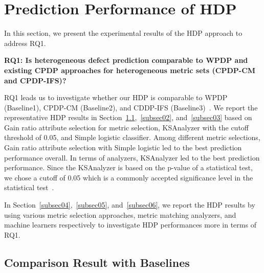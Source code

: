 \section{Prediction Performance of HDP}
\label{sec:Result}
In this section, we present the experimental results of the HDP approach to address RQ1.

{\bf RQ1: Is heterogeneous defect prediction comparable to WPDP and existing CPDP approaches for heterogeneous metric sets (CPDP-CM and CPDP-IFS)?}

RQ1 leads us to investigate whether our
HDP is comparable to WPDP (Baseline1), CPDP-CM
(Baseline2), and CDDP-IFS (Baseline3)~\cite{He14}. We report the representative HDP results in Section~\ref{subsec01},~\ref{subsec02}, and~\ref{subsec03} based on Gain ratio attribute selection for metric selection, KSAnalyzer with the cutoff threshold of 0.05, and Simple logistic classifier. Among different
metric selections, Gain ratio attribute selection with Simple logistic led to the best
prediction performance overall. In terms of analyzers, KSAnalyzer led to the best prediction performance.
Since the KSAnalyzer is based on the p-value of a statistical test, we chose a cutoff of 0.05 which is a commonly accepted significance level in the
statistical test~\cite{Corder09}.

In Section~\ref{subsec04},~\ref{subsec05}, and~\ref{subsec06}, we report the HDP results by using various metric selection approaches, metric matching analyzers, and machine learners respectively to investigate HDP performances more in terms of RQ1.

\subsection{Comparison Result with Baselines}
\label{subsec01}%

